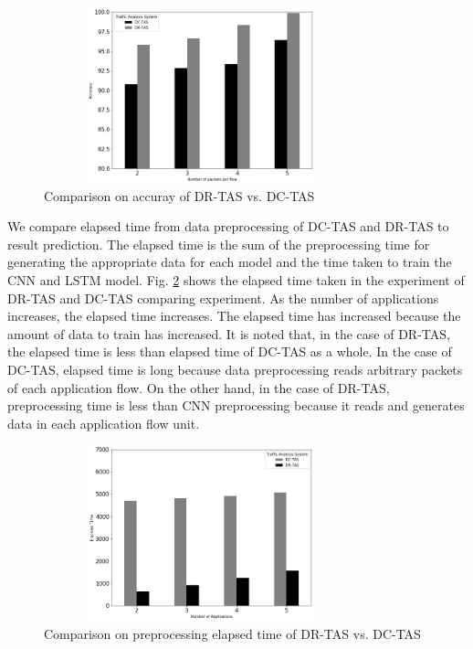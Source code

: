 \documentclass[10pt, twoside, jounal]{IEEEtran}
\begin{document}
\begin{figure}[!t]
\centering
\setlength{\abovecaptionskip}{0pt}
\setlength{\belowcaptionskip}{0pt}
{
\includegraphics[width=3.6in, height=2.0in]{fig5.jpg}
\caption{Comparison on accuray of DR-TAS vs. DC-TAS }
\label{fig5}
}
\end{figure}

We compare elapsed time from data preprocessing of DC-TAS and DR-TAS to result prediction.
The elapsed time is the sum of the preprocessing time for generating the appropriate data for each model and the time taken to train the CNN and LSTM model.
Fig. \ref{fig6} shows the elapsed time taken in the experiment of DR-TAS and DC-TAS comparing experiment.
As the number of applications increases, the elapsed time increases.
The elapsed time has increased because the amount of data to train has increased.
It is noted that, in the case of DR-TAS, the elapsed time is less than elapsed time of DC-TAS as a whole.
In the case of DC-TAS, elapsed time is long because data preprocessing reads arbitrary packets of each application flow.
On the other hand, in the case of DR-TAS, preprocessing time is less than CNN preprocessing because it reads and generates data in each application flow unit.

\begin{figure}[!t]
\centering
\setlength{\abovecaptionskip}{0pt}
\setlength{\belowcaptionskip}{0pt}
{
\includegraphics[width=3.6in, height=2.0in]{fig6.jpg}
\caption{Comparison on preprocessing elapsed time of DR-TAS vs. DC-TAS}
\label{fig6}
}
\end{figure}
\end{document}

